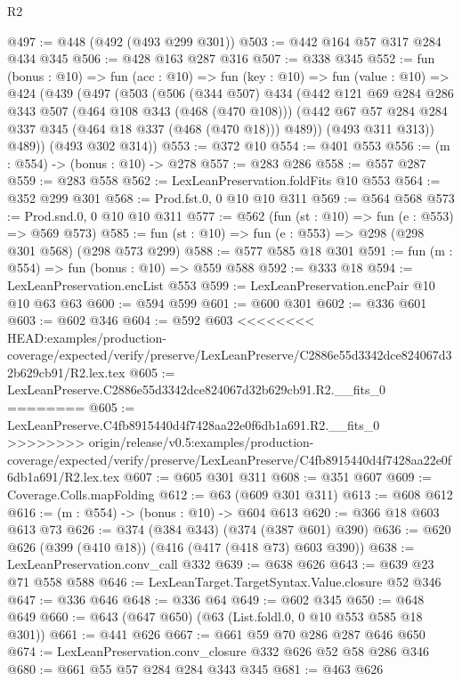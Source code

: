 \begin{lexlean}{R2}
\begin{coremodule}
{{{{{{{{{{{{{{{{{{{{{{@497 := @448 (@492 (@493 @299 @301))
@503 := @442 @164 @57 @317 @284 @434 @345
@506 := @428 @163 @287 @316
@507 := @338 @345
@552 := fun (bonus : @10) =>
  fun (acc : @10) =>
  fun (key : @10) =>
  fun (value : @10) =>
  @424
    (@439
      (@497
        (@503
          (@506
            (@344 @507)
            @434
            (@442
              @121
              @69
              @284
              @286
              @343
              @507
              (@464 @108 @343 (@468 (@470 @108)))
              (@442 @67 @57 @284 @284 @337 @345 (@464 @18 @337 (@468 (@470 @18))) @489))
            (@493 @311 @313))
          @489))
      (@493 @302 @314))
@553 := @372 @10
@554 := @401 @553
@556 := (m : @554) -> (bonus : @10) -> @278
@557 := @283 @286
@558 := @557 @287
@559 := @283 @558
@562 := LexLeanPreservation.foldFits @10 @553
@564 := @352 @299 @301
@568 := Prod.fst.{0, 0} @10 @10 @311
@569 := @564 @568
@573 := Prod.snd.{0, 0} @10 @10 @311
@577 := @562 (fun (st : @10) => fun (e : @553) => @569 @573)
@585 := fun (st : @10) => fun (e : @553) => @298 (@298 @301 @568) (@298 @573 @299)
@588 := @577 @585 @18 @301
@591 := fun (m : @554) => fun (bonus : @10) => @559 @588
@592 := @333 @18
@594 := LexLeanPreservation.encList @553
@599 := LexLeanPreservation.encPair @10 @10 @63 @63
@600 := @594 @599
@601 := @600 @301
@602 := @336 @601
@603 := @602 @346
@604 := @592 @603
<<<<<<<< HEAD:examples/production-coverage/expected/verify/preserve/LexLeanPreserve/C2886e55d3342dce824067d32b629cb91/R2.lex.tex
@605 := LexLeanPreserve.C2886e55d3342dce824067d32b629cb91.R2.__fits_0
========
@605 := LexLeanPreserve.C4fb8915440d4f7428aa22e0f6db1a691.R2.__fits_0
>>>>>>>> origin/release/v0.5:examples/production-coverage/expected/verify/preserve/LexLeanPreserve/C4fb8915440d4f7428aa22e0f6db1a691/R2.lex.tex
@607 := @605 @301 @311
@608 := @351 @607
@609 := Coverage.Colls.mapFolding
@612 := @63 (@609 @301 @311)
@613 := @608 @612
@616 := (m : @554) -> (bonus : @10) -> @604 @613
@620 := @366 @18 @603 @613 @73
@626 := @374 (@384 @343) (@374 (@387 @601) @390)
@636 := @620 @626 (@399 (@410 @18)) (@416 (@417 (@418 @73) @603 @390))
@638 := LexLeanPreservation.conv_call @332
@639 := @638 @626
@643 := @639 @23 @71 @558 @588
@646 := LexLeanTarget.TargetSyntax.Value.closure @52 @346
@647 := @336 @646
@648 := @336 @64
@649 := @602 @345
@650 := @648 @649
@660 := @643 (@647 @650) (@63 (List.foldl.{0, 0} @10 @553 @585 @18 @301))
@661 := @441 @626
@667 := @661 @59 @70 @286 @287 @646 @650
@674 := LexLeanPreservation.conv_closure @332 @626 @52 @58 @286 @346
@680 := @661 @55 @57 @284 @284 @343 @345
@681 := @463 @626
}}}}}}}}}}}}}}}}}}}}}}
\end{coremodule}
\end{lexlean}
